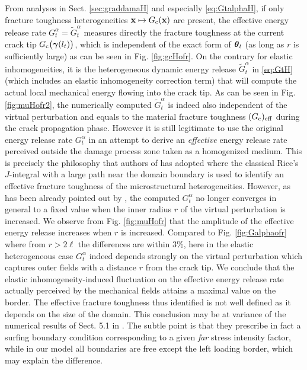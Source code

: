From analyses in Sect. \ref{sec:graddamaH} and especially \eqref{eq:GtalphaH}, if only fracture toughness heterogeneities $\vec{x}\mapsto\gc(\vec{x})$ are present, the effective energy release rate $G^\alpha_t=\widetilde{G}^\alpha_t$ measures directly the fracture toughness at the current crack tip $\gc\bigl(\vec{\gamma}(l_t)\bigr)$, which is independent of the exact form of $\vtheta_t$ (as long as $r$ is sufficiently large) as can be seen in Fig. \ref{fig:gcHofr}. On the contrary for elastic inhomogeneities, it is the heterogeneous dynamic energy release $\widetilde{G}_t^\alpha$ in \eqref{eq:GtH} (which includes an elastic inhomogeneity correction term) that will compute the actual local mechanical energy flowing into the crack tip. As can be seen in Fig. \ref{fig:muHofr2}, the numerically computed $\widetilde{G}_t^\alpha$ is indeed also independent of the virtual perturbation and equals to the material fracture toughness $(G_\mathrm{c})_\mathrm{eff}$ during the crack propagation phase. However it is still legitimate to use the original energy release rate $G_t^\alpha$ in an attempt to derive an \emph{effective} energy release rate perceived outside the damage process zone taken as a homogenized medium. This is precisely the philosophy that authors of \cite{HossainHsuehBourdinBhattachary:2014} has adopted where the classical Rice's $J$-integral with a large path near the domain boundary is used to identify an effective fracture toughness of the microstructural heterogeneities. However, as has been already pointed out by \cite{HossainHsuehBourdinBhattachary:2014}, the computed $G_t^\alpha$ no longer converges in general to a fixed value when the inner radius $r$ of the virtual perturbation is increased. We observe from Fig. \ref{fig:muHofr} that the amplitude of the effective energy release increases when $r$ is increased. Compared to Fig. \ref{fig:Galphaofr} where from $r>2\ell$ the differences are within 3\%, here in the elastic heterogeneous case $G^\alpha_t$ indeed depends strongly on the virtual perturbation which captures outer fields with a distance $r$ from the crack tip. We conclude that the elastic inhomogeneity-induced fluctuation on the effective energy release rate actually perceived by the mechanical fields attains a maximal value on the border. The effective fracture toughness thus identified is not well defined as it depends on the size of the domain. This conclusion may be at variance of the numerical results of Sect. 5.1 in \cite{HossainHsuehBourdinBhattachary:2014}. The subtle point is that they prescribe in fact a surfing boundary condition corresponding to a given \emph{far} stress intensity factor, while in our model all boundaries are free except the left loading border, which may explain the difference.
